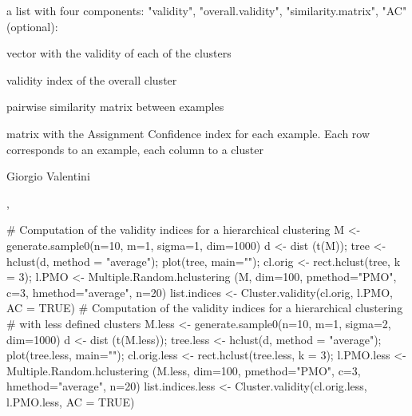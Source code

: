 \documentclass{article}
\begin{document}
\begin{Value}
a list with four components: "validity", "overall.validity", "similarity.matrix", "AC" (optional):
\begin{ldescription}
\item[\code{validity }] vector with the validity of each of the clusters
\item[\code{overall.validity }] validity index of the overall cluster
\item[\code{similarity.matrix }] pairwise similarity matrix between examples
\item[\code{AC }] matrix with the Assignment Confidence index for each example. Each row corresponds to an example, 
each column to a cluster
\end{ldescription}
\end{Value}
\begin{Author}\relax
Giorgio Valentini 
\end{Author}
\begin{SeeAlso}\relax
{} , 
\end{SeeAlso}
\begin{Examples}
\begin{ExampleCode}
# Computation of the validity indices for a hierarchical clustering 
M <- generate.sample0(n=10, m=1, sigma=1, dim=1000)
d <- dist (t(M)); 
tree <- hclust(d, method = "average");
plot(tree, main="");
cl.orig <- rect.hclust(tree, k = 3);
l.PMO <- Multiple.Random.hclustering (M, dim=100, pmethod="PMO", 
                                      c=3, hmethod="average", n=20)
list.indices <- Cluster.validity(cl.orig, l.PMO, AC = TRUE)
# Computation of the validity indices for a hierarchical clustering 
# with less defined clusters
M.less <- generate.sample0(n=10, m=1, sigma=2, dim=1000)
d <- dist (t(M.less)); 
tree.less <- hclust(d, method = "average");
plot(tree.less, main="");
cl.orig.less <- rect.hclust(tree.less, k = 3);
l.PMO.less <- Multiple.Random.hclustering (M.less, dim=100, pmethod="PMO", 
                                           c=3, hmethod="average", n=20)
list.indices.less <- Cluster.validity(cl.orig.less, l.PMO.less, AC = TRUE)
\end{ExampleCode}
\end{Examples}
\end{document}
